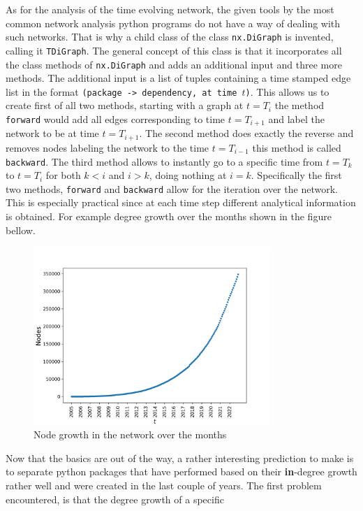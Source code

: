 \documentclass[a4paper]{article}
\begin{document}
As for the analysis of the time evolving network, the given tools by the most
common network analysis python programs do not have a way of dealing with
such networks. That is why a child class of the class \texttt{nx.DiGraph} is
invented, calling it \texttt{TDiGraph}. The general concept of this class is
that it incorporates all the class methods of \texttt{nx.DiGraph} and adds an
additional input and three more methods. The additional input is a list of
tuples containing a time stamped edge list in the format \texttt{(package ->
dependency, at time $t$)}. This allows us to create first of all two methods,
starting with a graph at $t=T_i$ the method \texttt{forward} would add all
edges corresponding to time $t=T_{i+1}$ and label the network to be at time
$t=T_{i+1}$. The second method does exactly the reverse and removes nodes
labeling the network to the time $t=T_{i-1}$ this method is called
\texttt{backward}. The third method allows to instantly go to a specific time
from $t=T_k$ to $t=T_i$ for both $k<i$ and $i>k$, doing nothing at $i=k$.
Specifically the first two methods, \texttt{forward} and \texttt{backward}
allow for the iteration over the network. This is especially practical since at
each time step different analytical information is obtained. For example degree
growth over the months shown in the figure bellow.
\begin{figure}[H]
    \centering
    \includegraphics[width=0.8\textwidth]{../pres/pics/deg_growth.png}
    \caption{Node growth in the network over the months}
\end{figure}
Now that the basics are out of the way, a rather interesting prediction to
make is to separate python packages that have performed based on their
\textbf{in}-degree growth rather well and were created in the last couple of
years. The first problem encountered, is that the degree growth of a specific
\end{document}
